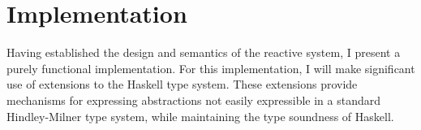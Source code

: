 \chapter{Implementation}
\label{chapter:Implementation}

Having established the design and semantics of the reactive system, I present a purely 
functional implementation. For this implementation, I will make significant use
of extensions to the Haskell type system. These extensions provide mechanisms for expressing
abstractions not easily expressible in a standard Hindley-Milner type system, while maintaining
the type soundness of Haskell.




